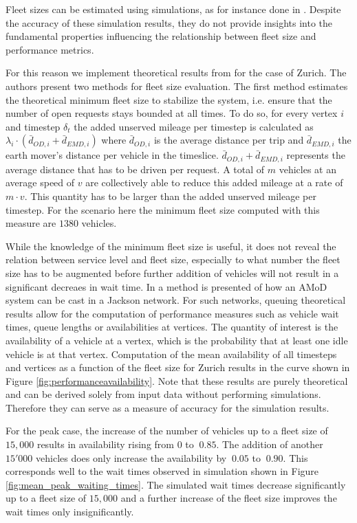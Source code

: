 Fleet sizes can be estimated using simulations, as for instance done in
\citep{bischoff2016simulation}. Despite the accuracy of these
simulation results, they do not provide insights into the fundamental
properties influencing the relationship between fleet size and performance metrics.

For this reason we implement theoretical results from \citep{spieser2014toward}
for the case of Zurich. The authors present two methods for fleet size evaluation.
The first method estimates the theoretical minimum fleet size to stabilize
the system, i.e. ensure that the number of open requests stays bounded at
all times. To do so, for every vertex $i$ and timestep $\delta_t$ the added
unserved mileage per timestep is calculated as
$\lambda_i \cdot ( \bar{d}_{OD,i}  + \bar{d}_{EMD,i})$ where $\bar{d}_{OD,i}$
is the average distance per trip and  $\bar{d}_{EMD,i}$ the earth mover's
distance per vehicle in the timeslice. $\bar{d}_{OD,i}  + \bar{d}_{EMD,i}$
represents the average distance that has to be driven per request. A total of
$m$ vehicles at an average speed of $v$ are collectively able to reduce this
 added mileage at a rate of $m \cdot v$. This quantity has to be larger than the
 added unserved mileage per timestep. For the scenario here the
 minimum fleet size computed with this measure are $1380$ vehicles.

While the knowledge of the minimum fleet size is useful, it does not reveal
the relation between service level and fleet size, especially to what number
the fleet size has to be augmented before further addition of vehicles will
not result in a significant decreaes in wait time. In \citep{zhang2016control}
 a method is presented of how an AMoD system can be cast in a Jackson network.
 For such networks, queuing theoretical results allow for the computation of
 performance measures such as vehicle wait times, queue lengths or
 availabilities at vertices. The quantity of interest is the availability
 of a vehicle at a vertex, which is the probability that at least one idle
 vehicle is at that vertex. Computation of the mean availability of all
 timesteps and vertices as a function of the fleet size for Zurich results
 in the curve shown in Figure \ref{fig:performanceavailability}. Note that these results
 are purely theoretical and can be derived solely from input data without performing simulations.
 Therefore they can serve as a measure of accuracy for the simulation results.

For the peak case, the increase of the number of vehicles up to a fleet size of $15,000$ results
in availability rising from $0$ to $~0.85$. The addition of another $15'000$ vehicles does only
increase the availability by $~0.05$ to $~0.90$. This corresponds well to the wait times observed
 in simulation shown in Figure \ref{fig:mean_peak_waiting_times}. The simulated wait times decrease
 significantly up to a fleet size of $15,000$ and a further increase of the fleet size
 improves the wait times only insignificantly.
